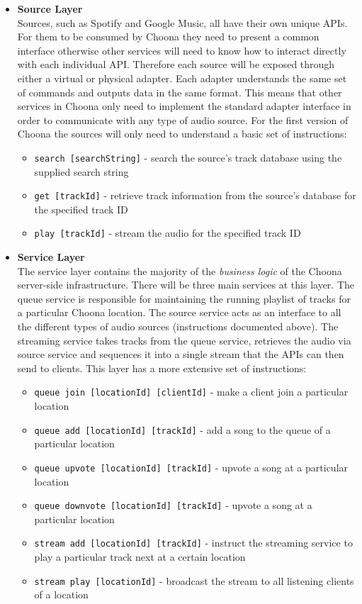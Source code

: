 \begin{itemize}
  \item \textbf{Source Layer}\\
    Sources, such as Spotify and Google Music, all have their own unique APIs. For them to be consumed by Choona they need to present a common interface otherwise other services will need to know how to interact directly with each individual API. Therefore each source will be exposed through either a virtual or physical adapter. Each adapter understands the same set of commands and outputs data in the same format. This means that other services in Choona only need to implement the standard adapter interface in order to communicate with any type of audio source. For the first version of Choona the sources will only need to understand a basic set of instructions:
    \begin{itemize}
      \item \texttt{search [searchString]} - search the source's track database using the supplied search string
      \item \texttt{get [trackId]} - retrieve track information from the source's database for the specified track ID
      \item \texttt{play [trackId]} - stream the audio for the specified track ID
    \end{itemize}

  \item \textbf{Service Layer}\\
    The service layer contains the majority of the \textit{business logic} of the Choona server-side infrastructure. There will be three main services at this layer. The queue service is responsible for maintaining the running playlist of tracks for a particular Choona location. The source service acts as an interface to all the different types of audio sources (instructions documented above). The streaming service takes tracks from the queue service, retrieves the audio via source service and sequences it into a single stream that the APIs can then send to clients. This layer has a more extensive set of instructions:
    \begin{itemize}
      \item \texttt{queue join [locationId] [clientId]} - make a client join a particular location
      \item \texttt{queue add [locationId] [trackId]} - add a song to the queue of a particular location
      \item \texttt{queue upvote [locationId] [trackId]} - upvote a song at a particular location
      \item \texttt{queue downvote [locationId] [trackId]} - upvote a song at a particular location
      \item \texttt{stream add [locationId] [trackId]} - instruct the streaming service to play a particular track next at a certain location
      \item \texttt{stream play [locationId]} - broadcast the stream to all listening clients of a location
    \end{itemize}


\end{itemize}
